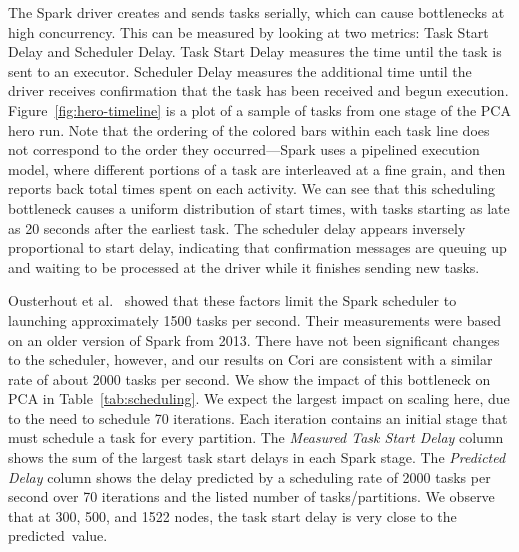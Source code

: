 The Spark driver creates and sends tasks serially, which can cause bottlenecks at high concurrency.  This can be measured by looking at two metrics: Task Start Delay and Scheduler Delay. Task Start Delay measures the time until the  task is sent to an executor. Scheduler Delay measures the additional time until the driver receives confirmation that the task has been received and begun execution. Figure~\ref{fig:hero-timeline} is a plot of a sample of tasks from one stage of the PCA hero run.  Note that the ordering of the colored bars within each task line does not correspond to the order they occurred---Spark uses a pipelined execution model, where different portions of a task are interleaved at a fine grain, and then reports back total times spent on each activity.  We can see that this scheduling bottleneck causes a uniform distribution of start times, with tasks starting as late as 20 seconds after the earliest task.  The scheduler delay appears inversely proportional to start delay, indicating that confirmation messages are queuing up and waiting to be processed at the driver while it finishes sending new tasks.



Ousterhout et al.~\cite{Ousterhout13Sparrow} showed that these factors limit the Spark scheduler to launching approximately 1500 tasks per second.  Their measurements were based on an older version of Spark from 2013.  There have not been significant changes to the scheduler, however, and our results on Cori are consistent with a similar rate of about 2000 tasks per second.  We show the impact of this bottleneck on PCA in Table~\ref{tab:scheduling}.  
We expect the largest impact on scaling here, due to the need to schedule 70 iterations.  Each iteration contains an initial stage that must schedule a task for every partition.  The \emph{Measured Task Start Delay} column shows the sum of the largest task start delays in each Spark stage.  The \emph{Predicted Delay} column shows the delay predicted by a scheduling rate of 2000 tasks per second over 70 iterations and the listed number of tasks/partitions.  We observe that at 300, 500, and 1522 nodes, the task start delay is very close to the predicted~value.%

